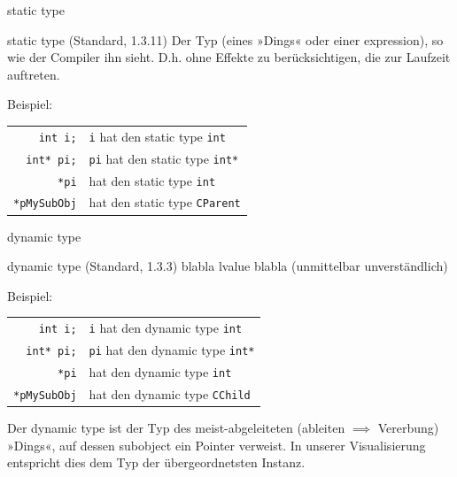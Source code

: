 \begin{frame}[fragile]{static type}
	\begin{block}{static type (Standard, 1.3.11)}
		Der Typ (eines »Dings« oder einer expression), so wie der Compiler ihn sieht. D.h. ohne Effekte zu berücksichtigen, die zur Laufzeit auftreten.
	\end{block}
	
	\vspace{2em}
	
	Beispiel:
	\begin{tabular}{r|l}
		\verb|int i;|	&	\verb|i| hat den static type \verb|int|	\\
		\verb|int* pi;|	&	\verb|pi| hat den static type \verb|int*|	\\
		\verb|*pi|	&	hat den static type \verb|int|	\\
		\verb|*pMySubObj|	&	hat den static type \verb|CParent|	\\
	\end{tabular}
\end{frame}

\begin{frame}[fragile]{dynamic type}
	\begin{block}{dynamic type (Standard, 1.3.3)}
		blabla lvalue blabla (unmittelbar unverständlich)
	\end{block}
	
	\vspace{2em}
	
	Beispiel:
	\begin{tabular}{r|l}
		\verb|int i;|	& \verb|i| hat den dynamic type \verb|int|	\\
		\verb|int* pi;|	& \verb|pi| hat den dynamic type \verb|int*|	\\
		\verb|*pi|	&	hat den dynamic type \verb|int|	\\
		\verb|*pMySubObj|	&	hat den dynamic type \verb|CChild|	\\
	\end{tabular}
	
	\vspace{1em}
	
	Der dynamic type ist der Typ des meist-abgeleiteten (ableiten $\implies$ Vererbung) »Dings«, auf dessen subobject ein Pointer verweist. In unserer Visualisierung entspricht dies dem Typ der übergeordnetsten Instanz.
\end{frame}

